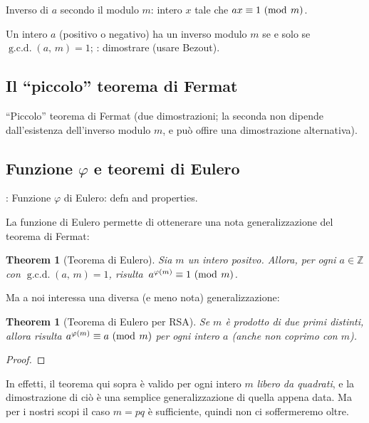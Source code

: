 \documentclass[pdflatex,11pt,a4paper,oneside]{article}
\renewcommand{\phi}{\varphi}
\renewcommand{\iff}[0]{se e solo se }
\newcommand{\XXX}[1][XXX]{\text{\bfseries{\color{red}{\emph{#1}}}}}
\newcommand{\TODO}[0]{\XXX[TODO]}
\newcommand{\Z}[0]{\mathbb{Z}}
\newcommand{\congruent}[0]{\equiv}
\newcommand{\mmodop}[0]{\ensuremath{\operatorname{mod}}}
\newcommand{\mmod}[1]{\ensuremath{\allowbreak\ (\mmodop\:{#1})}}
\newcommand{\gcdop}[0]{\ensuremath{\operatorname{g.c.d.}}}
\newcommand{\xgcd}[1]{\ensuremath{\gcdop\left({#1}\right)}}
\renewcommand{\gcd}[2]{\xgcd{{#1},\,{#2}}}
\newtheorem{theorem}[TheoremLike]{Theorem}
\begin{document}
Inverso di $a$ secondo il modulo $m$: intero $x$ tale che
$ax \congruent 1 \mmod m$.

Un intero $a$ (positivo o negativo) ha un inverso modulo $m$ \iff
$\gcd{a}{m} = 1$; \TODO: dimostrare (usare Bezout).


\subsection{Il ``piccolo'' teorema di Fermat}

``Piccolo'' teorema di Fermat (due dimostrazioni; la seconda non dipende
dall'esistenza dell'inverso modulo $m$, e pu\`o offire una dimostrazione
alternativa).


\subsection{Funzione $\phi$ e teoremi di Eulero}

\TODO: Funzione $\phi$ di Eulero: defn and properties.

La funzione di Eulero permette di ottenerare una nota generalizzazione
del teorema di Fermat:

\begin{theorem}[Teorema di Eulero]\label{thm:euler}
  Sia $m$ un intero positvo. Allora, per ogni $a \in \Z$ con
  $\gcd{a}{m} = 1$, risulta\, $a^{\phi(m)} \congruent 1 \mmod m$.
\end{theorem}

\noindent
Ma a noi interessa una diversa (e meno nota) generalizzazione:

\begin{theorem}[Teorema di Eulero per RSA]\label{thm:euler-rsa}
Se $m$ \`e prodotto di due primi \emph{distinti}, allora risulta
$a^{\phi(m)} \congruent a \mmod m$ per \emph{ogni} intero $a$ (anche
non coprimo con $m$).
\end{theorem}
%
\begin{proof}
 \TODO
\end{proof}

In effetti, il teorema qui sopra \`e valido per ogni intero $m$
\emph{libero da quadrati}, e la dimostrazione di ci\`o \`e una
semplice generalizzazione di quella appena data.  Ma per i nostri
scopi il caso $m = pq$ \`e sufficiente, quindi non ci soffermeremo
oltre.
\end{document}
